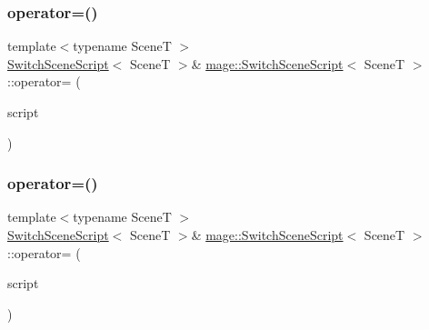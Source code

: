 \subsubsection{\texorpdfstring{operator=()}{operator=()}\hspace{0.1cm}{\footnotesize\ttfamily [1/2]}}
{\footnotesize\ttfamily template$<$typename SceneT $>$ \\
\hyperlink{classmage_1_1_switch_scene_script}{Switch\+Scene\+Script}$<$ SceneT $>$\& \hyperlink{classmage_1_1_switch_scene_script}{mage\+::\+Switch\+Scene\+Script}$<$ SceneT $>$\+::operator= (\begin{DoxyParamCaption}\item[{const \hyperlink{classmage_1_1_switch_scene_script}{Switch\+Scene\+Script}$<$ SceneT $>$ \&}]{script }\end{DoxyParamCaption})\hspace{0.3cm}{\ttfamily [delete]}}

\hypertarget{classmage_1_1_switch_scene_script_a9f78862b9432a35e9bd606e0be43966a}{}\label{classmage_1_1_switch_scene_script_a9f78862b9432a35e9bd606e0be43966a} 
\subsubsection{\texorpdfstring{operator=()}{operator=()}\hspace{0.1cm}{\footnotesize\ttfamily [2/2]}}
{\footnotesize\ttfamily template$<$typename SceneT $>$ \\
\hyperlink{classmage_1_1_switch_scene_script}{Switch\+Scene\+Script}$<$ SceneT $>$\& \hyperlink{classmage_1_1_switch_scene_script}{mage\+::\+Switch\+Scene\+Script}$<$ SceneT $>$\+::operator= (\begin{DoxyParamCaption}\item[{\hyperlink{classmage_1_1_switch_scene_script}{Switch\+Scene\+Script}$<$ SceneT $>$ \&\&}]{script }\end{DoxyParamCaption})\hspace{0.3cm}{\ttfamily [delete]}}

\hypertarget{classmage_1_1_switch_scene_script_a9a92e2f108741599f121dd9083d4a89b}{}\label{classmage_1_1_switch_scene_script_a9a92e2f108741599f121dd9083d4a89b} 
